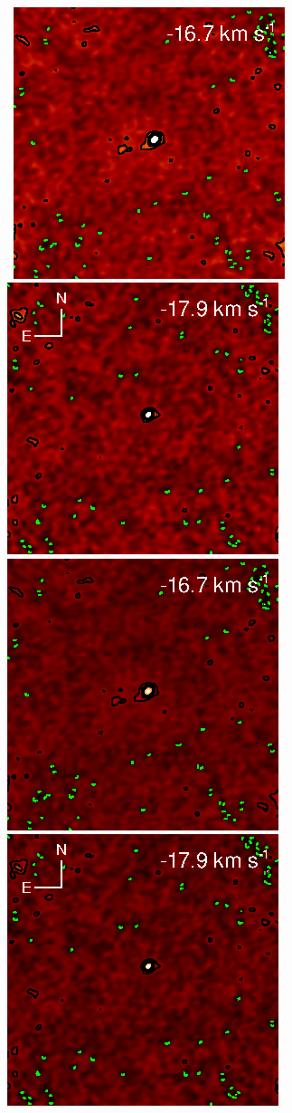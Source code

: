 \documentclass[preprint2]{aastex}
\begin{document}
\begin{figure}[hbt!]
{          }
\\
\mbox{
          \includegraphics[]{test40.ps}
          \includegraphics[]{test41.ps}
          \includegraphics[]{test_40.ps}
          \includegraphics[]{test_41.ps}
          }
\end{figure}
\end{document}
